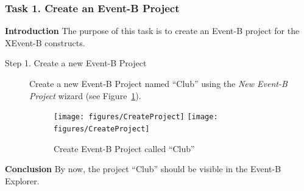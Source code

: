 \subsubsection{Task 1. Create an Event-B Project}\label{CreateProject}
\textbf{Introduction} The purpose of this task is to create an Event-B project for the XEvent-B constructs. 
\begin{description}
\item[Step 1. Create a new Event-B Project] Create a new Event-B Project named ``Club'' using the \emph{New Event-B Project} wizard (see Figure~\ref{fig:CreateProject}).
\begin{figure}[!htbp]
  \centering
  \texttt{[image: figures/CreateProject]}
  \else
  \texttt{[image: figures/CreateProject]}
  \endif
  \caption{Create Event-B Project called ``Club''}
  \label{fig:CreateProject}
\end{figure}

\end{description}
\textbf{Conclusion} By now, the project ``Club'' should be visible in the Event-B Explorer.


